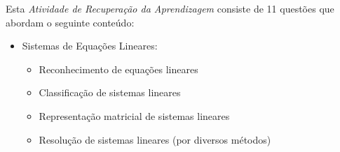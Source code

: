 \documentclass[pdftex, brazil, 12pt, oneside, addpoints]{exam}
\begin{document}
\newpage



\vspace{0.5cm}



Esta \emph{Atividade de Recuperação da Aprendizagem} consiste de
11 questões que abordam o seguinte conteúdo:

\begin{itemize}
\item Sistemas de Equações Lineares:
  \begin{itemize}
  \item Reconhecimento de equações lineares
  \item Classificação de sistemas lineares
  \item Representação matricial de sistemas lineares
  \item Resolução de sistemas lineares (por diversos métodos)
  \end{itemize}
\end{itemize}

\begin{center}
\end{center}
\end{document}
